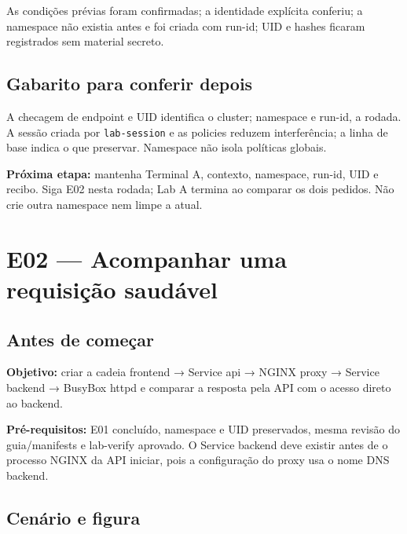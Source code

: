 \documentclass[12pt,openany,oneside,a4paper,chapter=TITLE,english,brazil]{abntex2}
\begin{document}
As condições prévias foram confirmadas; a identidade explícita conferiu; a namespace não existia antes e foi criada com run-id; UID e hashes ficaram registrados sem material secreto.

\section*{Gabarito para conferir depois}\label{gabarito-para-conferir-depois}

A checagem de endpoint e UID identifica o cluster; namespace e run-id, a rodada. A sessão criada por \texttt{lab-{}\allowbreak{}session} e as policies reduzem interferência; a linha de base indica o que preservar. Namespace não isola políticas globais.

\textbf{Próxima etapa:} mantenha Terminal A, contexto, namespace, run-id, UID e recibo. Siga E02 nesta rodada; Lab A termina ao comparar os dois pedidos. Não crie outra namespace nem limpe a atual.

\chapter*{E02 — Acompanhar uma requisição saudável}

\section*{Antes de começar}\label{antes-de-comeuxe7ar-1}

\textbf{Objetivo:} criar a cadeia frontend → Service api → NGINX proxy → Service backend → BusyBox httpd e comparar a resposta pela API com o acesso direto ao backend.

\textbf{Pré-requisitos:} E01 concluído, namespace e UID preservados, mesma revisão do guia/manifests e lab-verify aprovado. O Service backend deve existir antes de o processo NGINX da API iniciar, pois a configuração do proxy usa o nome DNS backend.

\section*{Cenário e figura}\label{cenuxe1rio-e-figura-1}
\end{document}
